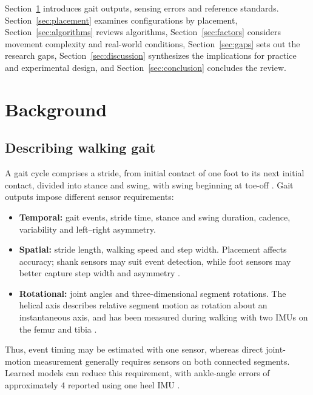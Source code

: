 \documentclass[10pt,a4paper,twocolumn]{article}
\begin{document}
Section~\ref{sec:background} introduces gait outputs, sensing errors and reference standards. Section~\ref{sec:placement} examines configurations by placement, Section~\ref{sec:algorithms} reviews algorithms, Section~\ref{sec:factors} considers movement complexity and real-world conditions, Section~\ref{sec:gaps} sets out the research gaps, Section~\ref{sec:discussion} synthesizes the implications for practice and experimental design, and Section~\ref{sec:conclusion} concludes the review.

\section{Background}
\label{sec:background}

\subsection{Describing walking gait}

A gait cycle comprises a stride, from initial contact of one foot to its next initial contact, divided into stance and swing, with swing beginning at toe-off \citep{perry2010}. Gait outputs impose different sensor requirements:

\begin{itemize}
  \item \textbf{Temporal:} gait events, stride time, stance and swing duration, cadence, variability and left--right asymmetry.
  \item \textbf{Spatial:} stride length, walking speed and step width. Placement affects accuracy; shank sensors may suit event detection, while foot sensors may better capture step width and asymmetry \citep{voisard2024}.
  \item \textbf{Rotational:} joint angles \citep{niswander2020,wang2025l} and three-dimensional segment rotations. The helical axis describes relative segment motion as rotation about an instantaneous axis, and has been measured during walking with two IMUs on the femur and tibia \citep{nishizawa2026}.
\end{itemize}

Thus, event timing may be estimated with one sensor, whereas direct joint-motion measurement generally requires sensors on both connected segments. Learned models can reduce this requirement, with ankle-angle errors of approximately 4\textdegree{} reported using one heel IMU \citep{wang2025l}.
\end{document}
